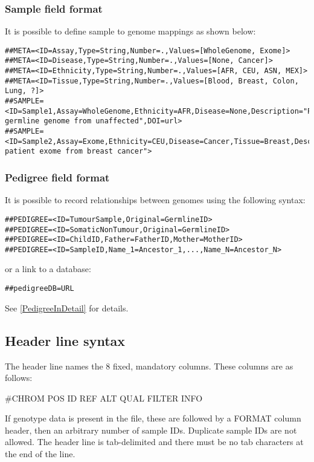 \documentclass[8pt]{article}
\begin{document}
\subsubsection{Sample field format}
It is possible to define sample to genome mappings as shown below:
{\scriptsize
\begin{verbatim}
##META=<ID=Assay,Type=String,Number=.,Values=[WholeGenome, Exome]>
##META=<ID=Disease,Type=String,Number=.,Values=[None, Cancer]>
##META=<ID=Ethnicity,Type=String,Number=.,Values=[AFR, CEU, ASN, MEX]>
##META=<ID=Tissue,Type=String,Number=.,Values=[Blood, Breast, Colon, Lung, ?]>
##SAMPLE=<ID=Sample1,Assay=WholeGenome,Ethnicity=AFR,Disease=None,Description="Patient germline genome from unaffected",DOI=url>
##SAMPLE=<ID=Sample2,Assay=Exome,Ethnicity=CEU,Disease=Cancer,Tissue=Breast,Description="European patient exome from breast cancer">
\end{verbatim}}

\subsubsection{Pedigree field format}
It is possible to record relationships between genomes using the following syntax:
\begin{verbatim}
##PEDIGREE=<ID=TumourSample,Original=GermlineID>
##PEDIGREE=<ID=SomaticNonTumour,Original=GermlineID>
##PEDIGREE=<ID=ChildID,Father=FatherID,Mother=MotherID>
##PEDIGREE=<ID=SampleID,Name_1=Ancestor_1,...,Name_N=Ancestor_N>
\end{verbatim}
\noindent or a link to a database:
\begin{verbatim}
##pedigreeDB=URL
\end{verbatim}

\noindent See \ref{PedigreeInDetail} for details.


\subsection{Header line syntax}
The header line names the 8 fixed, mandatory columns. These columns are as follows:
\begin{center}
       \#CHROM
\qquad POS
\qquad ID
\qquad REF
\qquad ALT
\qquad QUAL
\qquad FILTER
\qquad INFO
\end{center}
\noindent
If genotype data is present in the file, these are followed by a FORMAT column header, then an arbitrary number of sample IDs.
Duplicate sample IDs are not allowed.
The header line is tab-delimited and there must be no tab characters at the end of the line.
\end{document}
